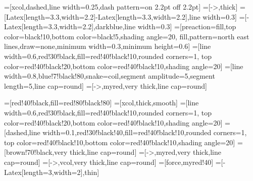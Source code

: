 \usepackage[outline]{contour} %
\usetikzlibrary{patterns,snakes}
\usetikzlibrary{arrows.meta} %
\contourlength{0.4pt}

=[xcol,dashed,line width=0.25,dash pattern=on 2.2pt off 2.2pt]
=[->,thick] %
=[{Latex[length=3.3,width=2.2]}-{Latex[length=3.3,width=2.2]},line width=0.3]
=[-{Latex[length=3.3,width=2.2]},darkblue,line width=0.3]
=[preaction={fill,top color=black!10,bottom color=black!5,shading angle=20},
                    fill,pattern=north east lines,draw=none,minimum width=0.3,minimum height=0.6]
=[line width=0.6,red!30!black,fill=red!40!black!10,rounded corners=1,
                  top color=red!40!black!20,bottom color=red!40!black!10,shading angle=20]
=[line width=0.8,blue!7!black!80,snake=coil,segment amplitude=5,segment length=5,line cap=round]
\tikzset{>=latex} %
=[->,myred,very thick,line cap=round]
\def\tick#1#2{\draw[thick] (#1)++(#2:0.1) --++ (#2-180:0.2)}

\usepackage{siunitx}
\usepackage{tikz,pgfplots}
\usepackage[outline]{contour} %
\usetikzlibrary{calc}
\usetikzlibrary{angles,quotes} %
\usetikzlibrary{arrows.meta}
\tikzset{>=latex} %
\contourlength{1.2pt}

=[red!40!black,fill=red!80!black!80]
=[xcol,thick,smooth]
=[line width=0.6,red!30!black,fill=red!40!black!10,rounded corners=1,
                  top color=red!40!black!20,bottom color=red!40!black!10,shading angle=20]
=[dashed,line width=0.1,red!30!black!40,fill=red!40!black!10,rounded corners=1,
                        top color=red!40!black!10,bottom color=red!40!black!10,shading angle=20]
=[brown!70!black,very thick,line cap=round]
\def\rope#1{ \draw[black,line width=1.4] #1; \draw[rope,line width=1.1] #1; }
=[->,myred,very thick,line cap=round]
=[->,vcol,very thick,line cap=round]
=[force,myred!40]
=[-{Latex[length=3,width=2]},thin]
\def\tick#1#2{\draw[thick] (#1)++(#2:0.12) --++ (#2-180:0.24)}
\DeclareMathOperator{\sn}{sn}
\DeclareMathOperator{\cn}{cn}
\DeclareMathOperator{\dn}{dn}
\def\N{80} %


